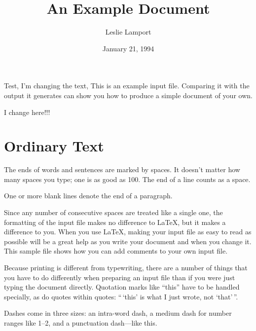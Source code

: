\documentclass[letterpaper, 10 pt, conference]{ieeeconf}  %
\title{An Example Document}  %
\author{Leslie Lamport}      %
\date{January 21, 1994}      %
\begin{document}

\maketitle                   %

Test, I'm changing the text, This is an example input file.  Comparing it with
the output it generates can show you how to
produce a simple document of your own.

I change here!!!

\section{Ordinary Text}      %

The ends  of words and sentences are marked
  by   spaces. It  doesn't matter how many
spaces    you type; one is as good as 100.  The
end of   a line counts as a space.

One   or more   blank lines denote the  end
of  a paragraph.

Since any number of consecutive spaces are treated
like a single one, the formatting of the input
file makes no difference to
      \LaTeX,                %
but it makes a difference to you.  When you use
\LaTeX, making your input file as easy to read
as possible will be a great help as you write
your document and when you change it.  This sample
file shows how you can add comments to your own input
file.

Because printing is different from typewriting,
there are a number of things that you have to do
differently when preparing an input file than if
you were just typing the document directly.
Quotation marks like
       ``this''
have to be handled specially, as do quotes within
quotes:
       ``\,`this'            %
        is what I just
        wrote, not  `that'\,''.

Dashes come in three sizes: an
       intra-word
dash, a medium dash for number ranges like
       1--2,
and a punctuation
       dash---like
this.
\end{document}
